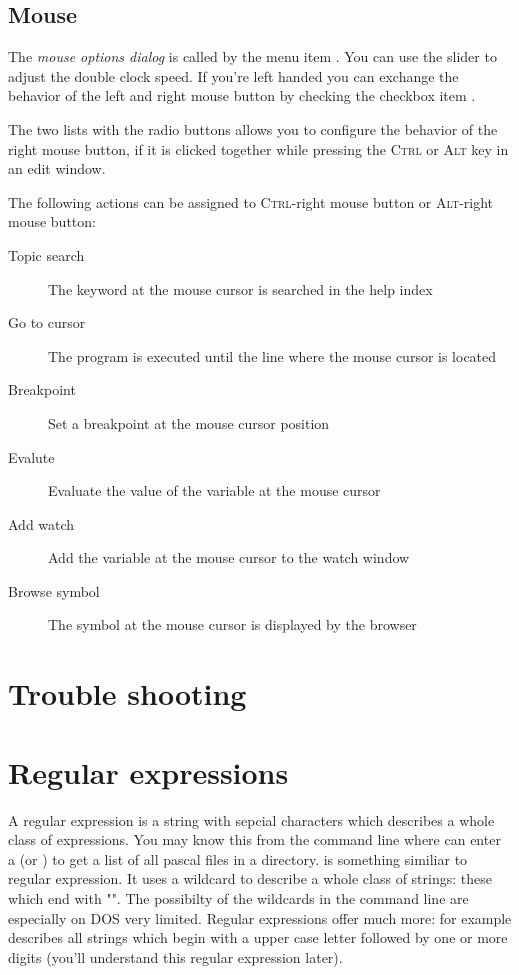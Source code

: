 \subsection{Mouse}
\label{ide:prefmouse}
The \emph{mouse options dialog} is called by the menu item
. You can use the slider to adjust the
double clock speed. If you're left handed you can exchange the
behavior of the left and right mouse button by checking the checkbox
item .

The two lists with the radio buttons allows you
to configure the behavior of the
right mouse button, if it is clicked together while
pressing the \textsc{Ctrl} or
\textsc{Alt} key in an edit window.

The following actions can be assigned to \textsc{Ctrl}-right mouse button or
\textsc{Alt}-right mouse button:

\begin{description}
\item [Topic search] The keyword at the mouse cursor is searched in the
help index
\item [Go to cursor] The program is executed until the line where
the mouse cursor is located
\item [Breakpoint] Set a breakpoint at the mouse cursor position
\item [Evalute] Evaluate the value of the variable at the mouse
cursor
\item [Add watch] Add the variable at the mouse cursor to the
watch window
\item [Browse symbol] The symbol at the mouse cursor is displayed
by the browser
\end{description}


\section{Trouble shooting}

\section{Regular expressions}
\label{ide:regexpr}
A regular expression is a string with sepcial characters which describes
a whole class of expressions. You may know this from the command line
where can enter a  (or ) to get a list
of all pascal files in a directory.  is something
similiar to regular expression. It uses a wildcard to describe a whole
class of strings: these which end with "". The possibilty
of the wildcards in the command line are especially on DOS very limited.
Regular expressions offer much more: for example \file{[A-Z][0-9]+}
describes all strings which begin with a upper case letter followed by
one or more digits (you'll understand this regular expression later).

